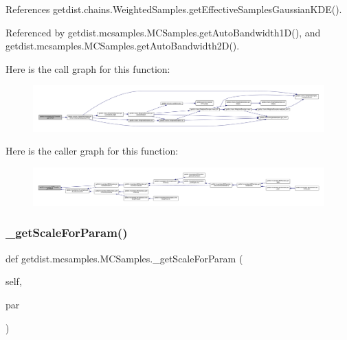 References getdist.\+chains.\+Weighted\+Samples.\+get\+Effective\+Samples\+Gaussian\+K\+D\+E().



Referenced by getdist.\+mcsamples.\+M\+C\+Samples.\+get\+Auto\+Bandwidth1\+D(), and getdist.\+mcsamples.\+M\+C\+Samples.\+get\+Auto\+Bandwidth2\+D().

Here is the call graph for this function\+:
\nopagebreak
\begin{figure}[H]
\begin{center}
\leavevmode
\includegraphics[width=350pt]{classgetdist_1_1mcsamples_1_1MCSamples_ab2849686882a2194c2e3c67e722cde18_cgraph}
\end{center}
\end{figure}
Here is the caller graph for this function\+:
\nopagebreak
\begin{figure}[H]
\begin{center}
\leavevmode
\includegraphics[width=350pt]{classgetdist_1_1mcsamples_1_1MCSamples_ab2849686882a2194c2e3c67e722cde18_icgraph}
\end{center}
\end{figure}
\mbox{\label{classgetdist_1_1mcsamples_1_1MCSamples_a1d4ac9d66e1401a3a2e082cd18393f2b}} 
\subsubsection{\texorpdfstring{\+\_\+get\+Scale\+For\+Param()}{\_getScaleForParam()}}
{\footnotesize\ttfamily def getdist.\+mcsamples.\+M\+C\+Samples.\+\_\+get\+Scale\+For\+Param (\begin{DoxyParamCaption}\item[{}]{self,  }\item[{}]{par }\end{DoxyParamCaption})\hspace{0.3cm}{\ttfamily [private]}}




